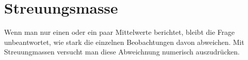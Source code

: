 \documentclass[oneside, 10pt]{book}\usepackage[]{graphicx}\usepackage[]{xcolor}
\begin{document}


\section{Streuungsmasse}
Wenn man nur einen oder ein paar Mittelwerte berichtet,
bleibt die Frage unbeantwortet, wie stark die einzelnen
Beobachtungen davon abweichen.
Mit Streuungmassen versucht man diese Abweichnung numerisch
auszudrücken.
\end{document}
